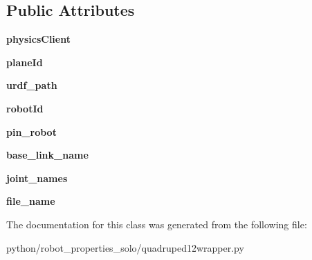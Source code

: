 \subsection*{Public Attributes}
\begin{DoxyCompactItemize}
\item 
{\bfseries physics\+Client}\hypertarget{classrobot__properties__solo_1_1quadruped12wrapper_1_1Quadruped12Robot_ab6d29b4091159910881859164306f70d}{}\label{classrobot__properties__solo_1_1quadruped12wrapper_1_1Quadruped12Robot_ab6d29b4091159910881859164306f70d}

\item 
{\bfseries plane\+Id}\hypertarget{classrobot__properties__solo_1_1quadruped12wrapper_1_1Quadruped12Robot_a0ba27c6cd4af635b567768e82dbcd277}{}\label{classrobot__properties__solo_1_1quadruped12wrapper_1_1Quadruped12Robot_a0ba27c6cd4af635b567768e82dbcd277}

\item 
{\bfseries urdf\+\_\+path}\hypertarget{classrobot__properties__solo_1_1quadruped12wrapper_1_1Quadruped12Robot_a7f1e81a0c8e5ce4fa73128cad591e286}{}\label{classrobot__properties__solo_1_1quadruped12wrapper_1_1Quadruped12Robot_a7f1e81a0c8e5ce4fa73128cad591e286}

\item 
{\bfseries robot\+Id}\hypertarget{classrobot__properties__solo_1_1quadruped12wrapper_1_1Quadruped12Robot_a63a931889c1a2fd6863aece3addfa12d}{}\label{classrobot__properties__solo_1_1quadruped12wrapper_1_1Quadruped12Robot_a63a931889c1a2fd6863aece3addfa12d}

\item 
{\bfseries pin\+\_\+robot}\hypertarget{classrobot__properties__solo_1_1quadruped12wrapper_1_1Quadruped12Robot_a0cbb9424a773b7c9b8000a17ce832b58}{}\label{classrobot__properties__solo_1_1quadruped12wrapper_1_1Quadruped12Robot_a0cbb9424a773b7c9b8000a17ce832b58}

\item 
{\bfseries base\+\_\+link\+\_\+name}\hypertarget{classrobot__properties__solo_1_1quadruped12wrapper_1_1Quadruped12Robot_a57d5f3a7ccd3746987de40e02244bf19}{}\label{classrobot__properties__solo_1_1quadruped12wrapper_1_1Quadruped12Robot_a57d5f3a7ccd3746987de40e02244bf19}

\item 
{\bfseries joint\+\_\+names}\hypertarget{classrobot__properties__solo_1_1quadruped12wrapper_1_1Quadruped12Robot_ad203f83c70bea7d6427df5a823abd178}{}\label{classrobot__properties__solo_1_1quadruped12wrapper_1_1Quadruped12Robot_ad203f83c70bea7d6427df5a823abd178}

\item 
{\bfseries file\+\_\+name}\hypertarget{classrobot__properties__solo_1_1quadruped12wrapper_1_1Quadruped12Robot_a2eee41ceae2b7948c09f894e9b371c17}{}\label{classrobot__properties__solo_1_1quadruped12wrapper_1_1Quadruped12Robot_a2eee41ceae2b7948c09f894e9b371c17}

\end{DoxyCompactItemize}


The documentation for this class was generated from the following file\+:\begin{DoxyCompactItemize}
\item 
python/robot\+\_\+properties\+\_\+solo/quadruped12wrapper.\+py\end{DoxyCompactItemize}
